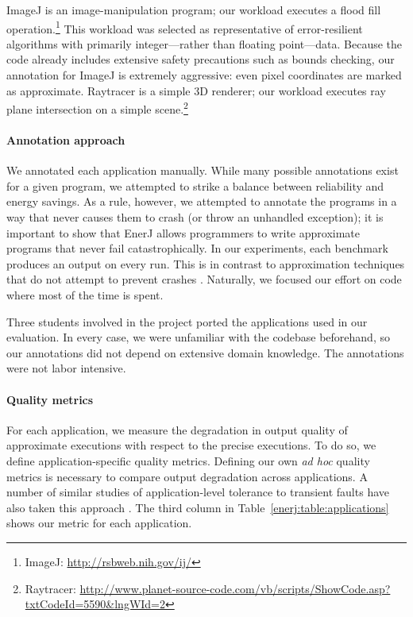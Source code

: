 ImageJ is an image-manipulation program; our workload executes a flood fill
operation.\footnote{ImageJ: \url{http://rsbweb.nih.gov/ij/}} This workload was
selected as representative of error-resilient algorithms with primarily
integer---rather than floating point---data.
Because the code already includes extensive
safety precautions such as bounds checking, our annotation for ImageJ is
extremely aggressive: even pixel coordinates are marked as approximate.
Raytracer is a simple 3D renderer; our workload executes
ray plane intersection on a simple scene.\footnote{Raytracer:
\url{http://www.planet-source-code.com/vb/scripts/ShowCode.asp?txtCodeId=5590&lngWId=2}}

\paragraph{Annotation approach} We annotated each application
manually. While many possible
annotations exist for a given program, we attempted to strike a
balance between reliability and energy savings. As a rule, however, we
attempted to annotate the programs in a way that never causes
them to crash (or throw an unhandled exception); it is important to
show that EnerJ allows programmers to write approximate programs that
never fail catastrophically. In our experiments, each benchmark produces
an output on every run. This is in contrast to approximation techniques
that do not attempt to prevent crashes \cite{flikker, wong-selse06, li07}.
Naturally, we focused our effort on code where most of the
time is spent.

Three students involved in the project
ported the applications used in our
evaluation. In every case, we were unfamiliar with the codebase
beforehand, so our annotations did not depend on extensive domain
knowledge. The annotations were not labor intensive.


\paragraph{Quality metrics} For each application, we measure the
degradation in output quality of approximate executions with respect
to the precise executions. To do so, we define application-specific
quality metrics. Defining our own \emph{ad hoc} quality metrics
is necessary to compare output degradation across applications.
A number of similar studies of
application-level tolerance to transient faults have also taken this
approach \cite{qosprof, green, dekruijf-selse09, ersa, wong-selse06,
  softcomputing}. The third column in
Table~\ref{enerj:table:applications} shows our metric for each application.

